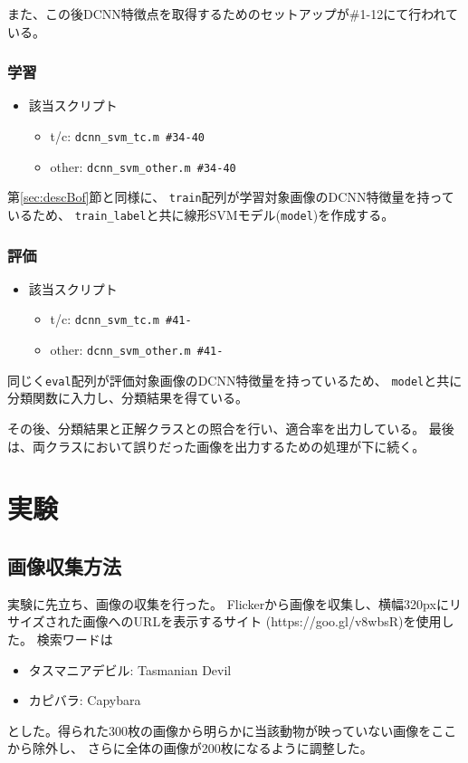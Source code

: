 \documentclass[11pt,a4paper, uplatex]{jsreport}
\begin{document}
また、この後DCNN特徴点を取得するためのセットアップが\#1-12にて行われている。
\subsubsection{学習}
\begin{itemize}
  \item 該当スクリプト
  \begin{itemize}
    \item t/c: \texttt{dcnn_svm_tc.m \#34-40}
    \item other: \texttt{dcnn_svm_other.m \#34-40}
  \end{itemize}
\end{itemize}
第\ref{sec:descBof}節と同様に、
\texttt{train}配列が学習対象画像のDCNN特徴量を持っているため、
\texttt{train_label}と共に線形SVMモデル(\texttt{model})を作成する。

\subsubsection{評価}
\begin{itemize}
  \item 該当スクリプト
  \begin{itemize}
    \item t/c: \texttt{dcnn_svm_tc.m \#41-}
    \item other: \texttt{dcnn_svm_other.m \#41-}
  \end{itemize}
\end{itemize}
同じく\texttt{eval}配列が評価対象画像のDCNN特徴量を持っているため、
\texttt{model}と共に分類関数に入力し、分類結果を得ている。

その後、分類結果と正解クラスとの照合を行い、適合率を出力している。
最後は、両クラスにおいて誤りだった画像を出力するための処理が下に続く。

\section{実験}
\subsection{画像収集方法}\label{sec:collectimg}
実験に先立ち、画像の収集を行った。
Flickerから画像を収集し、横幅320pxにリサイズされた画像へのURLを表示するサイト
(https://goo.gl/v8wbsR)を使用した。
検索ワードは
\begin{itemize}
  \item タスマニアデビル: Tasmanian Devil
  \item カピバラ: Capybara
\end{itemize}
とした。得られた300枚の画像から明らかに当該動物が映っていない画像をここから除外し、
さらに全体の画像が200枚になるように調整した。
\end{document}
